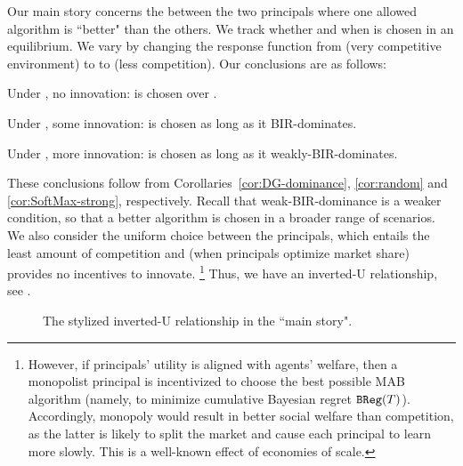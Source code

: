 Our main story concerns the \FiniteGame between the two principals where one allowed algorithm \alg is ``better" than the others. {We track whether and when \alg is chosen in an equilibrium.} We vary \competitiveness by changing the response function from \HardMax (very competitive environment) to \HardMaxRandom to  \SoftMaxRandom (less competition). Our conclusions are as follows:
\begin{OneLiners}
\item Under \HardMax, no innovation: \DynGreedy is chosen over \alg.
\item Under \HardMaxRandom, some innovation:  \alg is chosen as long as it BIR-dominates.
\item Under \SoftMaxRandom, more innovation: \alg is chosen as long as it weakly-BIR-dominates.%
\end{OneLiners}
These conclusions follow from Corollaries~\ref{cor:DG-dominance}, \ref{cor:random} and \ref{cor:SoftMax-strong}, respectively. Recall that weak-BIR-dominance is a weaker condition, so that a better algorithm is chosen in a broader range of scenarios. We also consider the uniform choice between the principals, which entails the least amount of competition and (when principals optimize market share) provides no incentives to innovate.%
\footnote{However, if principals' utility is aligned with agents' welfare, then a monopolist principal is incentivized to choose the best possible MAB algorithm (namely, to minimize cumulative Bayesian regret $\mathtt{BReg}(T)$). Accordingly, monopoly would result in better social welfare than competition, as the latter is likely to split the market and cause each principal to learn more slowly. This is a well-known effect of economies of scale.}
Thus, we have an inverted-U relationship, see .


\begin{figure}[t]
\begin{center}

\caption{The stylized inverted-U relationship in the ``main story".}
\label{fig:inverted-U2}
\end{center}
\end{figure}


